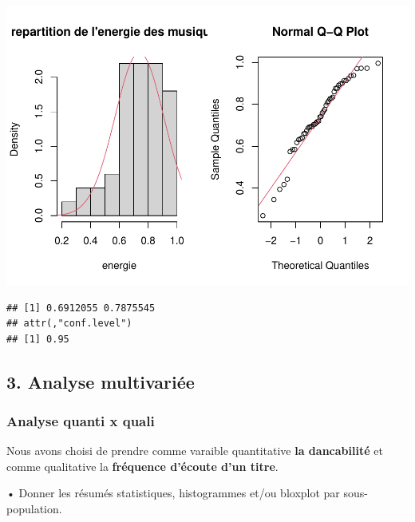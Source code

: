 \documentclass[
]{article}
\newenvironment{Shaded}{\begin{snugshade}}{\end{snugshade}}
\newcommand{\AttributeTok}[1]{\textcolor[rgb]{0.77,0.63,0.00}{#1}}
\newcommand{\FunctionTok}[1]{\textcolor[rgb]{0.00,0.00,0.00}{#1}}
\newcommand{\NormalTok}[1]{#1}
\newcommand{\OtherTok}[1]{\textcolor[rgb]{0.56,0.35,0.01}{#1}}
\newcommand{\SpecialCharTok}[1]{\textcolor[rgb]{0.00,0.00,0.00}{#1}}
\newcommand{\StringTok}[1]{\textcolor[rgb]{0.31,0.60,0.02}{#1}}
\begin{document}
\includegraphics{spotify_analysis_files/figure-latex/unnamed-chunk-8-1.pdf}

\begin{Shaded}
\end{Shaded}

\begin{verbatim}
## [1] 0.6912055 0.7875545
## attr(,"conf.level")
## [1] 0.95
\end{verbatim}

\hypertarget{analyse-multivariuxe9e}{%
\subsection{3. Analyse multivariée}\label{analyse-multivariuxe9e}}

\hypertarget{analyse-quanti-x-quali}{%
\subsubsection{Analyse quanti x quali}\label{analyse-quanti-x-quali}}

Nous avons choisi de prendre comme varaible quantitative \textbf{la
dancabilité} et comme qualitative la \textbf{fréquence d'écoute d'un
titre}.

• Donner les résumés statistiques, histogrammes et/ou bloxplot par
sous-population.

\begin{Shaded}
\end{Shaded}
\end{document}
